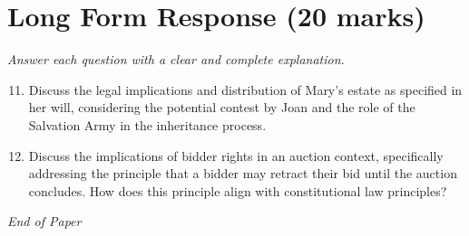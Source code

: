 \documentclass[12pt]{article}
\begin{document}
\section*{Long Form Response (20 marks)}
\textit{Answer each question with a clear and complete explanation.}
\begin{enumerate}[label=\arabic*.]
\setcounter{enumi}{10}
\item Discuss the legal implications and distribution of Mary's estate as specified in her will, considering the potential contest by Joan and the role of the Salvation Army in the inheritance process.
\item Discuss the implications of bidder rights in an auction context, specifically addressing the principle that a bidder may retract their bid until the auction concludes. How does this principle align with constitutional law principles?
\end{enumerate}

\vfill
\noindent\textit{End of Paper}
\end{document}
